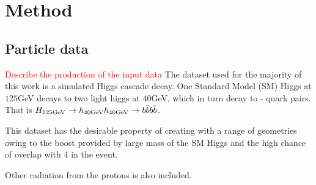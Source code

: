 \section{Method}
\subsection{Particle data}
\textcolor{red}{Describe the production of the input data}
The dataset used for the majority of this work is a simulated Higgs cascade decay.
One Standard Model (SM) Higgs at \(125\)GeV decays to two light higgs at \(40\)GeV,
which in turn decay to \beau{}-\bbar{} quark pairs.
That is \(H_{125\text{GeV}} \rightarrow h_{40\text{GeV}} h_{40\text{GeV}} \rightarrow b \bar{b} b \bar{b}\).


This dataset has the desirable property of creating  with a range of geometries
owing to the boost provided by large mass of the SM Higgs and
the high chance of overlap with 4  in the event.

Other radiation from the protons is also included.  %

